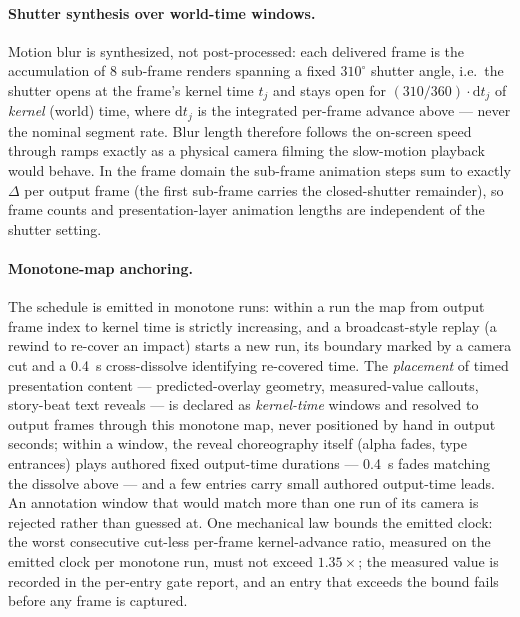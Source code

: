 \paragraph{Shutter synthesis over world-time windows.}
Motion blur is synthesized, not post-processed: each delivered frame is
the accumulation of 8 sub-frame renders spanning a fixed
$310^\circ$ shutter angle, i.e.\ the shutter opens at the frame's kernel
time $t_j$ and stays open for $(310/360) \cdot \mathrm{d}t_j$ of
\emph{kernel} (world) time, where $\mathrm{d}t_j$ is the integrated
per-frame advance above --- never the nominal segment rate. Blur length
therefore follows the on-screen speed through ramps exactly as a
physical camera filming the slow-motion playback would behave. In the
frame domain the sub-frame animation steps sum to exactly $\Delta$ per
output frame (the first sub-frame carries the closed-shutter
remainder), so frame counts and presentation-layer animation lengths
are independent of the shutter setting.

\paragraph{Monotone-map anchoring.}
The schedule is emitted in monotone runs: within a run the map from
output frame index to kernel time is strictly increasing, and a
broadcast-style replay (a rewind to re-cover an impact) starts a new
run, its boundary marked by a camera cut and a 0.4~s cross-dissolve
identifying re-covered time. The \emph{placement} of timed presentation
content ---
predicted-overlay geometry, measured-value callouts, story-beat text
reveals --- is declared as \emph{kernel-time} windows and resolved to
output frames through this monotone map, never positioned by hand in
output seconds; within a window, the reveal choreography itself (alpha
fades, type entrances) plays authored fixed output-time durations ---
0.4~s fades matching the dissolve above --- and a few entries carry
small authored output-time leads. An annotation window that would match
more than one run of its
camera is rejected rather than guessed at. One mechanical law bounds
the emitted clock: the worst consecutive cut-less per-frame
kernel-advance ratio, measured on the emitted clock per monotone run,
must not exceed $1.35\times$; the measured value is recorded in the
per-entry gate report, and an entry that exceeds the bound fails before
any frame is captured.

